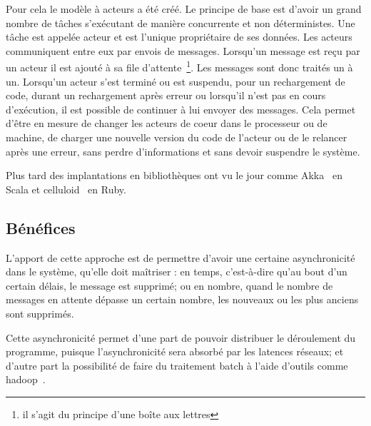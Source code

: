 \documentclass{article}
\begin{document}
Pour cela le modèle à acteurs a été créé. Le principe de base est d'avoir un grand
nombre de tâches s'exécutant de manière concurrente et non déterministes.
Une tâche est appelée acteur et est l'unique propriétaire de ses données.
Les acteurs communiquent entre eux par envois de messages.
Lorsqu'un message est reçu par un acteur il est ajouté à sa file d'attente~\footnote{il s'agit du principe d'une boîte aux lettres}.
Les messages sont donc traités un à un.
Lorsqu'un acteur s'est terminé ou est suspendu, pour un rechargement de code, durant
un rechargement après erreur ou lorsqu'il n'est pas en cours d'exécution, il est possible
de continuer à lui envoyer des messages.
Cela permet d'être en mesure de changer les acteurs de coeur dans le processeur ou
de machine, de charger une nouvelle version du code de l'acteur ou de le relancer
après une erreur, sans perdre d'informations et sans devoir suspendre le système.

Plus tard des implantations en bibliothèques ont vu le jour comme Akka~\cite{akka}
en Scala et celluloid~\cite{celluloid} en Ruby.

\subsection{Bénéfices}\label{bénéfices}
L'apport de cette approche est de permettre d'avoir une certaine
asynchronicité dans le système, qu'elle doit maîtriser :
en temps, c'est-à-dire qu'au bout d'un certain délais, le message est supprimé;
ou en nombre, quand le nombre de messages en attente dépasse un certain nombre,
les nouveaux ou les plus anciens sont supprimés.

Cette asynchronicité permet d'une part de pouvoir distribuer le
déroulement du programme, puisque l'asynchronicité sera absorbé par les
latences réseaux; et d'autre part la possibilité de faire du traitement
batch à l'aide d'outils comme hadoop~\cite{hadoop}.
\end{document}
